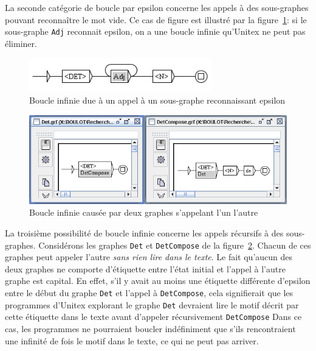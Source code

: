 \bigskip
\noindent La seconde catégorie de boucle par epsilon concerne les appels à des sous-graphes pouvant
reconnaître le mot vide. Ce cas de figure est illustré par la
figure~\ref{fig-epsilon-subgraph-loop}: si le sous-graphe \verb+Adj+ reconnait epsilon, on a une
boucle infinie qu’Unitex ne peut pas éliminer.

\bigskip
\begin{figure}[!ht]
\begin{center}
\includegraphics[width=7.9cm]{resources/img/fig6-9.png}
\caption{Boucle infinie due à un appel à un sous-graphe reconnaissant epsilon
\label{fig-epsilon-subgraph-loop}}
\end{center}
\end{figure}

\begin{figure}[!ht]
\begin{center}
\includegraphics[width=15.5cm]{resources/img/fig6-10.png}
\caption{Boucle infinie causée par deux graphes s'appelant l'un l'autre
\label{fig-recursive-calls-loop}}
\end{center}
\end{figure}

\noindent La troisième possibilité de boucle infinie concerne les appels récursifs à des
sous-graphes. Considérons les graphes \verb+Det+ et \verb+DetCompose+ de la
figure~\ref{fig-recursive-calls-loop}.
 Chacun de ces graphes peut appeler l’autre \textit{sans rien lire dans le texte}. Le fait qu’aucun
 des deux graphes ne comporte d’étiquette entre l’état initial et l’appel à l’autre graphe est
 capital. En effet, s’il y avait au moins une étiquette différente d’epsilon entre le début du
 graphe \verb+Det+ et l’appel à \verb+DetCompose+, cela signifierait que les programmes d’Unitex
 explorant le graphe \verb+Det+ devraient lire le motif décrit par cette étiquette dans le texte
 avant d’appeler récursivement \verb+DetCompose+ Dans ce cas, les programmes ne pourraient boucler
 indéfiniment que s’ils rencontraient une infinité de fois le motif dans le texte, ce qui ne peut
 pas arriver.


